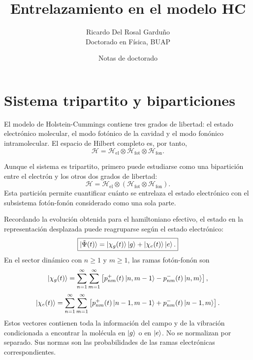 \documentclass[11pt]{article}
\title{Entrelazamiento en el modelo HC}
\author{Ricardo Del Rosal Gardu\~no \\ \small Doctorado en F\'isica, BUAP}
\date{Notas de doctorado}
\begin{document}
\maketitle

\tableofcontents
\bigskip

\section{Sistema tripartito y biparticiones}

El modelo de Holstein-Cummings contiene tres grados de libertad: el estado
electr\'onico molecular, el modo fot\'onico de la cavidad y el modo fon\'onico
intramolecular. El espacio de Hilbert completo es, por tanto,
\begin{equation}
  \boxed{
  \mathcal H
  =
  \mathcal H_{\mathrm{el}}
  \otimes
  \mathcal H_{\mathrm{fot}}
  \otimes
  \mathcal H_{\mathrm{fon}}.
  }
\end{equation}

Aunque el sistema es tripartito, primero puede estudiarse como una
bipartici\'on entre el electr\'on y los otros dos grados de libertad:
\begin{equation}
  \mathcal H
  =
  \mathcal H_{\mathrm{el}}
  \otimes
  \left(
  \mathcal H_{\mathrm{fot}}
  \otimes
  \mathcal H_{\mathrm{fon}}
  \right).
\end{equation}
Esta partici\'on permite cuantificar cu\'anto se entrelaza el estado electr\'onico
con el subsistema fot\'on-fon\'on considerado como una sola parte.

Recordando la evoluci\'on obtenida para el hamiltoniano efectivo, el estado en
la representaci\'on desplazada puede reagruparse seg\'un el estado electr\'onico:
\begin{equation}
  \boxed{
  \ket{\tilde\Psi(t)}
  =
  \ket{\chi_g(t)}\ket g
  +
  \ket{\chi_e(t)}\ket e.
  }
\end{equation}
En el sector din\'amico con $n\geq1$ y $m\geq1$, las ramas fot\'on-fon\'on son
\begin{equation}
  \ket{\chi_g(t)}
  =
  \sum_{n=1}^{\infty}
  \sum_{m=1}^{\infty}
  \left[
  p_{nm}^{+}(t)\ket{n,m-1}
  -
  p_{nm}^{-}(t)\ket{n,m}
  \right],
\end{equation}
\begin{equation}
  \ket{\chi_e(t)}
  =
  \sum_{n=1}^{\infty}
  \sum_{m=1}^{\infty}
  \left[
  p_{nm}^{+}(t)\ket{n-1,m-1}
  +
  p_{nm}^{-}(t)\ket{n-1,m}
  \right].
\end{equation}
Estos vectores contienen toda la informaci\'on del campo y de la vibraci\'on
condicionada a encontrar la mol\'ecula en $\ket g$ o en $\ket e$. No se
normalizan por separado. Sus normas son las probabilidades de las ramas
electr\'onicas correspondientes.
\end{document}
